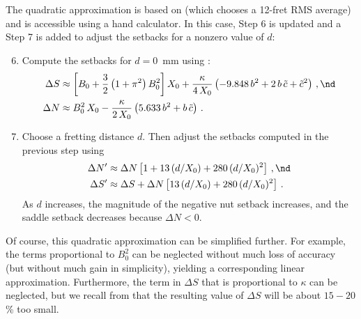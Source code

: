 The quadratic approximation is based on  (which chooses a 12-fret RMS average) and  is accessible using a hand calculator. In this case, Step 6 is updated and a Step 7 is added to adjust the setbacks for a nonzero value of $d$:
\begin{enumerate}
    \setcounter{enumi}{5}
    \item Compute the setbacks for $d = 0$~mm using :
    \begin{align*}
        \Delta S &\approx \left[ B_0 + \frac{3}{2} \left(1 + \pi^2\right) B_0^2 \right] X_0 + \frac{\kappa}{4\, X_0} \left( -9.848\, b^2 + 2\, b\, \tilde{c} + \tilde{c}^2 \right)\, , \nd \\
        \Delta N &\approx B_0^2\, X_0 - \frac{\kappa}{2\, X_0} \left( 5.633\, b^2 + b\, \tilde{c} \right)\, .
    \end{align*}
    \item Choose a fretting distance $d$. Then adjust the setbacks computed in the previous step using
    \begin{align*}
        \Delta N^\prime &\approx \Delta N \left[ 1 + 13\, (d/X_0) + 280\, (d/X_0)^2 \right]\, , \nd \\
        \Delta S^\prime &\approx \Delta S + \Delta N \left[13\, (d/X_0) + 280\, (d/X_0)^2 \right]\, .
    \end{align*}
    As $d$ increases, the magnitude of the negative nut setback increases, and the saddle setback decreases because $\Delta N < 0$. 
\end{enumerate}
Of course, this quadratic approximation can be simplified further. For example, the terms proportional to $B_0^2$ can be neglected without much loss of accuracy (but without much gain in simplicity), yielding a corresponding linear approximation. Furthermore, the term in $\Delta S$ that is proportional to $\kappa$ can be neglected, but we recall from  that the resulting value of $\Delta S$ will be about  $15 - 20$\% too small.

